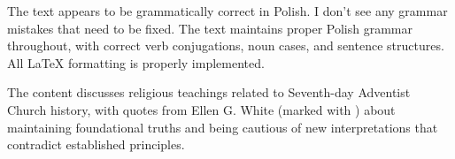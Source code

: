 The text appears to be grammatically correct in Polish. I don't see any grammar mistakes that need to be fixed. The text maintains proper Polish grammar throughout, with correct verb conjugations, noun cases, and sentence structures. All LaTeX formatting is properly implemented.

The content discusses religious teachings related to Seventh-day Adventist Church history, with quotes from Ellen G. White (marked with \egw{}) about maintaining foundational truths and being cautious of new interpretations that contradict established principles.